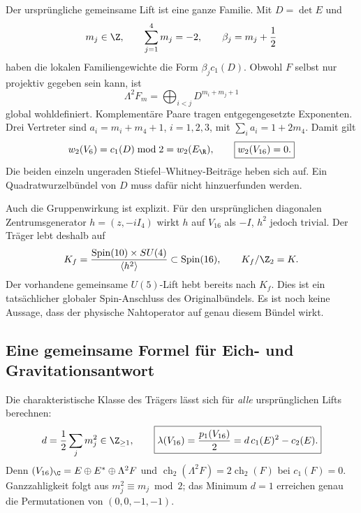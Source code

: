 Der ursprüngliche gemeinsame Lift ist eine ganze Familie. Mit $D=\det E$ und
\begin{equation}
m_j\in\Z,\qquad \sum_{j=1}^4m_j=-2,\qquad \beta_j=m_j+\frac12
\end{equation}
haben die lokalen Familiengewichte die Form $\beta_j c_1(D)$. Obwohl $F$ selbst nur projektiv gegeben sein kann, ist
\begin{equation}
\Lambda^2F_m=\bigoplus_{i<j}D^{m_i+m_j+1}
\end{equation}
global wohldefiniert. Komplementäre Paare tragen entgegengesetzte Exponenten. Drei Vertreter sind $a_i=m_i+m_4+1$, $i=1,2,3$, mit $\sum_i a_i=1+2m_4$. Damit gilt
\begin{equation}
w_2(V_6)=c_1(D)\bmod2=w_2(E_{\R}),\qquad
\boxed{w_2(V_{16})=0.}
\end{equation}
Die beiden einzeln ungeraden Stiefel--Whitney-Beiträge heben sich auf. Ein Quadratwurzelbündel von $D$ muss dafür nicht hinzuerfunden werden.

Auch die Gruppenwirkung ist explizit. Für den ursprünglichen diagonalen Zentrumsgenerator $h=(z,-iI_4)$ wirkt $h$ auf $V_{16}$ als $-I$, $h^2$ jedoch trivial. Der Träger lebt deshalb auf
\begin{equation}
K_f=\frac{\mathrm{Spin}(10)\times SU(4)}{\langle h^2\rangle}
\subset\mathrm{Spin}(16),\qquad K_f/\Z_2=K.
\end{equation}
Der vorhandene gemeinsame $U(5)$-Lift hebt bereits nach $K_f$. Dies ist ein tatsächlicher globaler Spin-Anschluss des Originalbündels. Es ist noch keine Aussage, dass der physische Nahtoperator auf genau diesem Bündel wirkt.


\subsection{Eine gemeinsame Formel für Eich- und Gravitationsantwort}\label{sec:nativeanomaly}
Die charakteristische Klasse des Trägers lässt sich für \emph{alle} ursprünglichen Lifts berechnen:
\begin{equation}\label{eq:nativelambda}
d=\frac12\sum_jm_j^2\in\Z_{\ge1},\qquad
\boxed{\lambda(V_{16})=\frac{p_1(V_{16})}{2}
=d\,c_1(E)^2-c_2(E).}
\end{equation}
Denn $(V_{16})_{\C}=E\oplus E^*\oplus\Lambda^2F$ und
$\operatorname{ch}_2(\Lambda^2F)=2\operatorname{ch}_2(F)$ bei $c_1(F)=0$.
Ganzzahligkeit folgt aus $m_j^2\equiv m_j\bmod2$; das Minimum $d=1$ erreichen genau die Permutationen von $(0,0,-1,-1)$.

